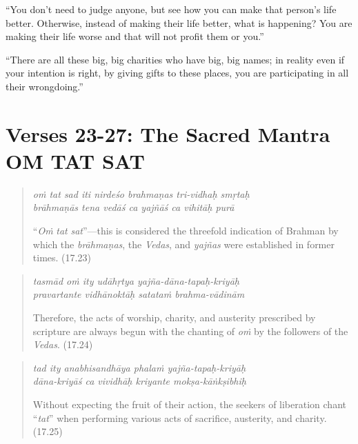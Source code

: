 \documentclass[12pt, twoside, openright]{memoir}
\begin{document}
\enquote{You don’t need to judge anyone, but see how you can make that person’s life better. Otherwise, instead of making their life better, what is happening? You are making their life worse and that will not profit them or you.}

\enquote{There are all these big, big charities who have big, big names; in reality even if your intention is right, by giving gifts to these places, you are participating in all their wrongdoing.}

\section{Verses 23-27: The Sacred Mantra OṀ TAT SAT}\label{sec-verses-23-27-the-sacred-mantra-om-tat-sat}


\par
\begin{verse}
\textit{oṁ tat sad iti nirdeśo brahmaṇas tri-vidhaḥ smṛtaḥ} \\
\textit{brāhmaṇās tena vedāś ca yajñāś ca vihitāḥ purā}

\noindent \enquote{\textit{Oṁ} \textit{tat} \textit{sat}}---this is considered the threefold indication of Brahman by which the \textit{brāhmaṇas}, the \textit{Vedas}, and \textit{yajñas} were established in former times. (17.23)
\end{verse}
\par



\par
\begin{verse}
\textit{tasmād oṁ ity udāhṛtya yajña-dāna-tapaḥ-kriyāḥ} \\
\textit{pravartante vidhānoktāḥ satataṁ brahma-vādinām}

\noindent Therefore, the acts of worship, charity, and austerity prescribed by scripture are always begun with the chanting of \textit{oṁ} by the followers of the \textit{Vedas}. (17.24)
\end{verse}
\par



\par
\begin{verse}
\textit{tad ity anabhisandhāya phalaṁ yajña-tapaḥ-kriyāḥ} \\
\textit{dāna-kriyāś ca vividhāḥ kriyante mokṣa-kāṅkṣibhiḥ}

\noindent Without expecting the fruit of their action, the seekers of liberation chant \enquote{\textit{tat}} when performing various acts of sacrifice, austerity, and charity. (17.25)
\end{verse}
\par
\end{document}
